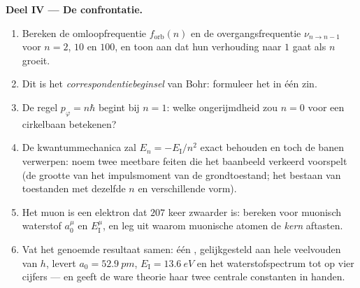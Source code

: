 \begin{problem}
\medskip\noindent\textbf{Deel IV --- De confrontatie.}
\begin{enumerate}[resume]
  \item Bereken de omloopfrequentie $f_{\text{orb}}(n)$ en de
        overgangsfrequentie $\nu_{n \to n-1}$ voor $n = 2$, $10$ en
        $100$, en toon aan dat hun verhouding naar $1$ gaat als $n$
        groeit.
  \item Dit is het \emph{correspondentiebeginsel} van Bohr: formuleer
        het in één zin.
  \item De regel $p_\varphi = n\hbar$ begint bij $n = 1$: welke
        ongerijmdheid zou $n = 0$ voor een cirkelbaan betekenen?
  \item De kwantummechanica zal $E_n = -E_{\text{I}}/n^2$ exact
        behouden en toch de banen verwerpen: noem twee meetbare feiten
        die het baanbeeld verkeerd voorspelt (de grootte van het
        impulsmoment van de grondtoestand; het bestaan van toestanden
        met dezelfde $n$ en verschillende vorm).
  \item Het muon is een elektron dat $207$ keer zwaarder is: bereken
        voor muonisch waterstof $a_0^\mu$ en $E_{\text{I}}^\mu$, en leg
        uit waarom muonische atomen de \emph{kern} aftasten.
  \item Vat het genoemde resultaat samen: één ,
        gelijkgesteld aan hele veelvouden van $h$, levert $a_0 = \qty{52.9}{pm}$, $E_{\text{I}} = \qty{13.6}{eV}$ en het
        waterstofspectrum tot op vier cijfers --- en geeft de ware
        theorie haar twee centrale constanten in handen.
\end{enumerate}
\end{problem}
